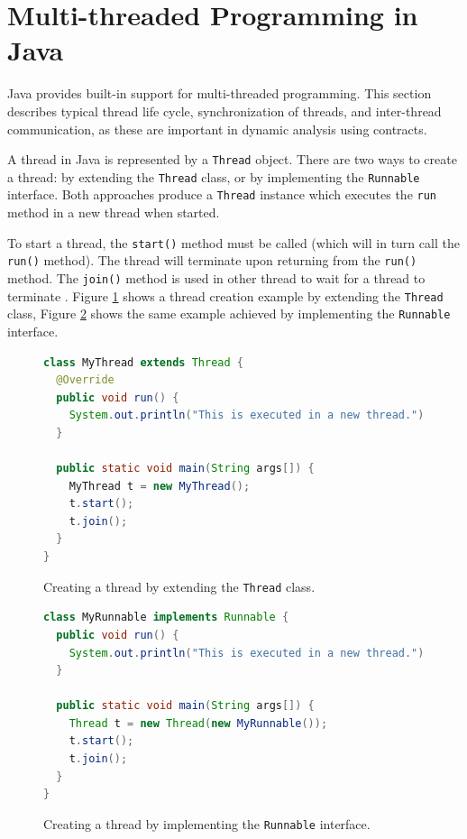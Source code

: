 \section{Multi-threaded Programming in Java}

Java provides built-in support for multi-threaded programming. This section
describes typical thread life cycle, synchronization of threads, and
inter-thread communication, as these are important in dynamic analysis using
contracts.

A thread in Java is represented by a \texttt{Thread} object. There are two ways
to create a thread: by extending the \texttt{Thread} class, or by implementing
the \texttt{Runnable} interface. Both approaches produce a \texttt{Thread}
instance which executes the \texttt{run} method in a new thread when started.

To start a thread, the \texttt{start()} method must be called (which will in
turn call the \texttt{run()} method). The thread will terminate upon returning
from the \texttt{run()} method. The \texttt{join()} method is used in other
thread to wait for a thread to terminate \cite{javaTheCompleteReference}.
Figure \ref{threadExtend} shows a thread creation example by extending the
\texttt{Thread} class, Figure \ref{threadRunnable} shows the same example
achieved by implementing the \texttt{Runnable} interface.

\begin{figure}[hbt]
    \label{threadExtend}
\begin{lstlisting}[language=java]
class MyThread extends Thread {
  @Override
  public void run() {
    System.out.println("This is executed in a new thread.");
  }

  public static void main(String args[]) {
    MyThread t = new MyThread();
    t.start();
    t.join();
  }
}
\end{lstlisting}
    \caption{Creating a thread by extending the \texttt{Thread} class.}
\end{figure}

\begin{figure}[hbt]
    \label{threadRunnable}
\begin{lstlisting}[language=java]
class MyRunnable implements Runnable {
  public void run() {
    System.out.println("This is executed in a new thread.");
  }

  public static void main(String args[]) {
    Thread t = new Thread(new MyRunnable());
    t.start();
    t.join();
  }
}
\end{lstlisting}
    \caption{Creating a thread by implementing the \texttt{Runnable} interface.}
\end{figure}

